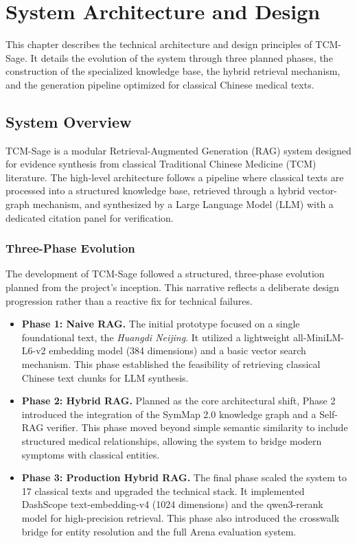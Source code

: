 \chapter{System Architecture and Design}

This chapter describes the technical architecture and design principles of TCM-Sage. It details the evolution of the system through three planned phases, the construction of the specialized knowledge base, the hybrid retrieval mechanism, and the generation pipeline optimized for classical Chinese medical texts.

\section{System Overview}

TCM-Sage is a modular Retrieval-Augmented Generation (RAG) system designed for evidence synthesis from classical Traditional Chinese Medicine (TCM) literature. The high-level architecture follows a pipeline where classical texts are processed into a structured knowledge base, retrieved through a hybrid vector-graph mechanism, and synthesized by a Large Language Model (LLM) with a dedicated citation panel for verification.

\subsection{Three-Phase Evolution}

The development of TCM-Sage followed a structured, three-phase evolution planned from the project's inception. This narrative reflects a deliberate design progression rather than a reactive fix for technical failures.

\begin{itemize}
    \item \textbf{Phase 1: Naive RAG.} The initial prototype focused on a single foundational text, the \textit{Huangdi Neijing}. It utilized a lightweight all-MiniLM-L6-v2 embedding model (384 dimensions) and a basic vector search mechanism. This phase established the feasibility of retrieving classical Chinese text chunks for LLM synthesis.
    \item \textbf{Phase 2: Hybrid RAG.} Planned as the core architectural shift, Phase 2 introduced the integration of the SymMap 2.0 knowledge graph and a Self-RAG verifier. This phase moved beyond simple semantic similarity to include structured medical relationships, allowing the system to bridge modern symptoms with classical entities.
    \item \textbf{Phase 3: Production Hybrid RAG.} The final phase scaled the system to 17 classical texts and upgraded the technical stack. It implemented DashScope text-embedding-v4 (1024 dimensions) and the qwen3-rerank model for high-precision retrieval. This phase also introduced the crosswalk bridge for entity resolution and the full Arena evaluation system.
\end{itemize}

